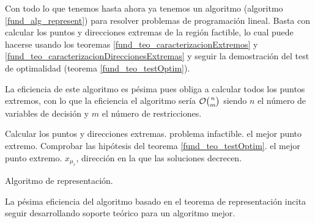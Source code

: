 \begin{obs}
	Con todo lo que tenemos hasta ahora ya tenemos un algoritmo (algoritmo \ref{fund_alg_represent}) para resolver problemas de programación lineal. Basta con calcular los puntos y direcciones extremas de la región factible, lo cual puede hacerse usando los teoremas \ref{fund_teo_caracterizacionExtremos} y \ref{fund_teo_caracterizacionDireccionesExtremas} y seguir la demostración del test de optimalidad (teorema \ref{fund_teo_testOptim}).
	
	La eficiencia de este algoritmo es pésima pues obliga a calcular todos los puntos extremos, con lo que la eficiencia el algoritmo sería $\mathcal{O}\binom{n}{m}$ siendo $n$ el número de variables de decisión y $m$ el número de restricciones.
\end{obs}
\begin{algorithm}[H]
	\begin{algorithmic}[1]
		\STATE Calcular los puntos y direcciones extremas.
			\RETURN problema infactible.
			\RETURN el mejor punto extremo.
		\ELSE\STATE{}
			\STATE Comprobar las hipótesis del teorema \ref{fund_teo_testOptim}.
				\RETURN el mejor punto extremo.
			\ELSE
				\RETURN $x_{\mu_r}$, dirección en la que las soluciones decrecen.
			\ENDIF
		\ENDIF
	\end{algorithmic}
	\caption{Algoritmo de representación.}
	\label{fund_alg_represent}
\end{algorithm}
La pésima eficiencia del algoritmo basado en el teorema de representación incita seguir desarrollando soporte teórico para un algoritmo mejor.

